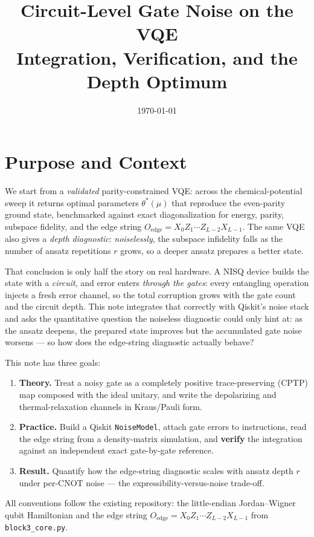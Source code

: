 \documentclass[11pt]{article}
\title{Circuit-Level Gate Noise on the VQE\\
\large Integration, Verification, and the Depth Optimum}
\author{}
\date{\today}
\newcommand{\Oedge}{X_0 Z_1\cdots Z_{L-2} X_{L-1}}
\begin{document}
\maketitle

\section{Purpose and Context}

We start from a \emph{validated} parity-constrained VQE: across the chemical-potential sweep it returns optimal parameters $\theta^*(\mu)$ that reproduce the even-parity ground state, benchmarked against exact diagonalization for energy, parity, subspace fidelity, and the edge string $O_{\mathrm{edge}}=\Oedge$. The same VQE also gives a \emph{depth diagnostic}: \emph{noiselessly}, the subspace infidelity falls as the number of ansatz repetitions $r$ grows, so a deeper ansatz prepares a better state.

That conclusion is only half the story on real hardware. A NISQ device builds the state with a \emph{circuit}, and error enters \emph{through the gates}: every entangling operation injects a fresh error channel, so the total corruption grows with the gate count and the circuit depth. This note integrates that correctly with Qiskit's noise stack and asks the quantitative question the noiseless diagnostic could only hint at: as the ansatz deepens, the prepared state improves but the accumulated gate noise worsens --- so how does the edge-string diagnostic actually behave?

This note has three goals:
\begin{enumerate}
  \item \textbf{Theory.} Treat a noisy gate as a completely positive trace-preserving (CPTP) map composed with the ideal unitary, and write the depolarizing and thermal-relaxation channels in Kraus/Pauli form.
  \item \textbf{Practice.} Build a Qiskit \texttt{NoiseModel}, attach gate errors to instructions, read the edge string from a density-matrix simulation, and \textbf{verify} the integration against an independent exact gate-by-gate reference.
  \item \textbf{Result.} Quantify how the edge-string diagnostic scales with ansatz depth $r$ under per-CNOT noise --- the expressibility-versus-noise trade-off.
\end{enumerate}

All conventions follow the existing repository: the little-endian Jordan--Wigner qubit Hamiltonian and the edge string $O_{\mathrm{edge}}=\Oedge$ from \texttt{block3\_core.py}.
\end{document}
